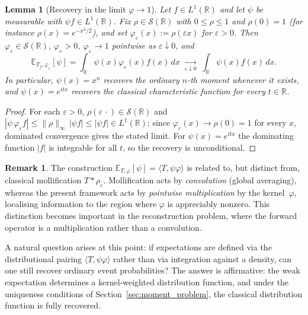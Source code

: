 \documentclass[12pt]{article}
\newtheorem{lemma}[theorem]{Lemma}
\theoremstyle{definition}
\newtheorem{remark}[theorem]{Remark}
\newcommand{\R}{\mathbb{R}}
\newcommand{\E}{\mathbb{E}}
\newcommand{\pulo}{\vspace{0.2cm}}
\begin{document}
\begin{lemma}[Recovery in the limit $\varphi\to1$]\label{lem:phi-to-1}
Let $f\in L^1(\R)$ and let $\psi$ be measurable with $\psi f\in L^1(\R)$.
Fix $\rho\in\mathcal{S}(\R)$ with $0\le\rho\le1$ and $\rho(0)=1$ (for
instance $\rho(x)=e^{-x^2/2}$), and set $\varphi_\varepsilon(x):=\rho(\varepsilon x)$
for $\varepsilon>0$.  Then $\varphi_\varepsilon\in\mathcal{S}(\R)$,
$\varphi_\varepsilon>0$, $\varphi_\varepsilon\to1$ pointwise as
$\varepsilon\downarrow0$, and
\[
\E_{T_f,\varphi_\varepsilon}[\psi]
=\int_\R \psi(x)\varphi_\varepsilon(x)f(x)\,dx
\;\xrightarrow[\varepsilon\downarrow0]{}\;
\int_\R\psi(x)f(x)\,dx .
\]
In particular, $\psi(x)=x^n$ recovers the ordinary $n$-th moment whenever it
exists, and $\psi(x)=e^{itx}$ recovers the classical characteristic function
for every $t\in\R$.
\end{lemma}

\begin{proof}
For each $\varepsilon>0$, $\rho(\varepsilon\,\cdot)\in\mathcal{S}(\R)$ and
$|\psi\,\varphi_\varepsilon f|\le\|\rho\|_\infty\,|\psi f|\le|\psi f|\in
L^1(\R)$; since $\varphi_\varepsilon(x)\to\rho(0)=1$ for every $x$, dominated
convergence gives the stated limit.  For $\psi(x)=e^{itx}$ the dominating
function $|f|$ is integrable for all $t$, so the recovery is unconditional.
\end{proof}

\begin{remark}\label{rem:mollification}
The construction $\E_{T,\varphi}[\psi] = \langle T,\psi\varphi\rangle$ is related to, but distinct from, classical mollification $T*\rho_\varepsilon$.  Mollification acts by \emph{convolution} (global averaging), whereas the present framework acts by \emph{pointwise multiplication} by the kernel~$\varphi$, localising information to the region where $\varphi$ is appreciably nonzero.  This distinction becomes important in the reconstruction problem, where the forward operator is a multiplication rather than a convolution.
\end{remark}

\pulo

A natural question arises at this point: if expectations are defined via the distributional pairing $\langle T,\psi\varphi\rangle$ rather than via integration against a density, can one still recover ordinary event probabilities?  The answer is affirmative: the weak expectation determines a kernel-weighted distribution function, and under the uniqueness conditions of Section~\ref{sec:moment_problem}, the classical distribution function is fully recovered.
\end{document}
